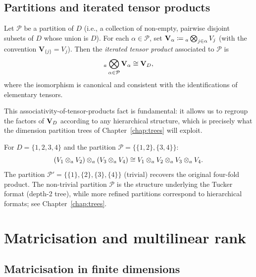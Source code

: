 \subsection*{Partitions and iterated tensor products}

\begin{definition}
\label{def:partition_tensor}
Let $\mathcal{P}$ be a partition of $D$ (i.e., a collection of
non-empty, pairwise disjoint subsets of $D$ whose union is $D$).
For each $\alpha \in \mathcal{P}$, set
$\mathbf{V}_\alpha \coloneqq {}_a\bigotimes_{j \in \alpha} V_j$
(with the convention $\mathbf{V}_{\{j\}} = V_j$). Then the
\emph{iterated tensor product} associated to $\mathcal{P}$ is
\begin{equation}
\label{eq:iterated_tensor}
    {}_a\bigotimes_{\alpha \in \mathcal{P}} \mathbf{V}_\alpha
    \cong \mathbf{V}_D,
\end{equation}
where the isomorphism is canonical and consistent with the
identifications of elementary tensors.
\end{definition}

This associativity-of-tensor-products fact is fundamental: it allows us
to regroup the factors of $\mathbf{V}_D$ according to any hierarchical structure,
which is precisely what the dimension partition trees of
Chapter~\ref{chap:trees} will exploit.

\begin{example}
\label{ex:iterated_tensor}
For $D = \{1,2,3,4\}$ and the partition
$\mathcal{P} = \{\{1,2\}, \{3,4\}\}$:
\begin{equation*}
    (V_1 \otimes_a V_2) \otimes_a (V_3 \otimes_a V_4) \cong
    V_1 \otimes_a V_2 \otimes_a V_3 \otimes_a V_4.
\end{equation*}
The partition $\mathcal{P}' = \{\{1\},\{2\},\{3\},\{4\}\}$ (trivial)
recovers the original four-fold product. The non-trivial partition
$\mathcal{P}$ is the structure underlying the Tucker format
(depth-2 tree), while more refined partitions correspond to hierarchical
formats; see Chapter~\ref{chap:trees}.
\end{example}

\section{Matricisation and multilinear rank}
\label{sec:algtensor:rank}

\subsection*{Matricisation in finite dimensions}


